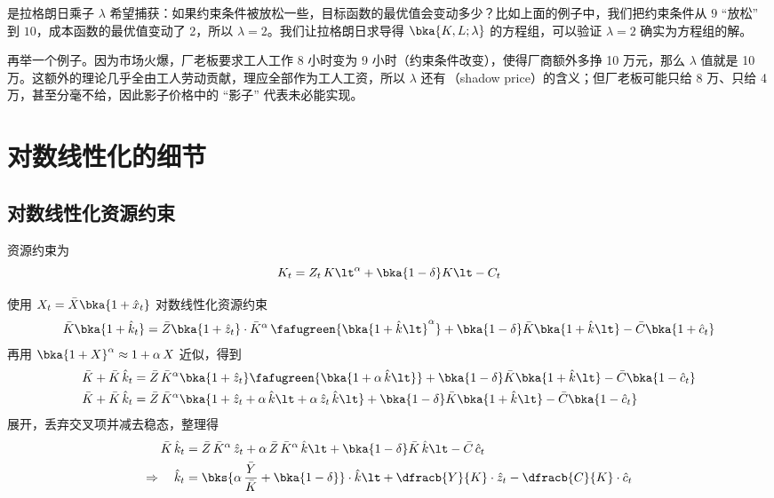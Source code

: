 是拉格朗日乘子 \(\lambda\) 希望捕获：如果约束条件被放松一些，目标函数的最优值会变动多少？比如上面的例子中，我们把约束条件从 \(9\) “放松” 到 \(10\)，成本函数的最优值变动了 2，所以 \(\lambda=2\)。我们让拉格朗日求导得 \(\bka{K,L;\lambda}\) 的方程组，可以验证 \(\lambda=2\) 确实为方程组的解。

再举一个例子。因为市场火爆，厂老板要求工人工作 8 小时变为 9 小时（约束条件改变），使得厂商额外多挣 10 万元，那么 \(\lambda\) 值就是 10 万。这额外的理论几乎全由工人劳动贡献，理应全部作为工人工资，所以 \(\lambda\) 还有\,（shadow price）的含义；但厂老板可能只给 8 万、只给 4 万，甚至分毫不给，因此影子价格中的 “影子” 代表未必能实现。

\section{对数线性化的细节}\label{sec:LogLinProcess}

\subsection{对数线性化资源约束}

资源约束为
\begin{equation*}
    K_t=Z_t\,K\lt^\alpha+\bka{1-\delta}K\lt-C_t
\end{equation*}


使用 \(X_t=\bar X\bka{1+\hat x_t}\) 对数线性化资源约束
\begin{align*}
    \bar K\bka{1+\hat k_t}=\bar Z\bka{1+\hat z_t}\cdot \bar K^{\alpha}\,\fafugreen{\bka{1+\hat k\lt}^\alpha}+\bka{1-\delta}\bar K\bka{1+\hat k\lt}-\bar C\bka{1+\hat c_t}
\end{align*}
再用 \(\bka{1+X}^\alpha\approx1+\alpha\,X\) 近似，得到
\begin{align*}
    \bar K+\bar K\,\hat k_t&=\bar Z\,\bar K^{\alpha}\bka{1+\hat z_t}\fafugreen{\bka{1+\alpha\,\hat k\lt}}+\bka{1-\delta}\bar K\bka{1+\hat k\lt}-\bar C\bka{1-\hat c_t}\\
    \bar K+\bar K\,\hat k_t&=\bar Z\,\bar K^\alpha\bka{1+\hat z_t+\alpha\,\hat k\lt+\alpha\,\hat z_t\,\hat k\lt}+\bka{1-\delta}\bar K\bka{1+\hat k\lt}-\bar C\bka{1-\hat c_t}
\end{align*}
展开，丢弃交叉项并减去稳态，整理得
\begin{align*}
    \bar K\,\hat k_t&=\bar Z\,\bar K^\alpha\,\hat z_t+\alpha\,\bar Z\,\bar K^\alpha\,\hat k\lt+\bka{1-\delta}\bar K\,\hat k\lt-\bar C\,\hat c_t\\
    \Rightarrow\quad \hat k_t&=\bks{\alpha\,\dfrac{\bar Y}{\bar K}+\bka{1-\delta}}\cdot\hat k\lt+\dfracb{Y}{K}\cdot\hat z_t-\dfracb{C}{K}\cdot\hat c_t
\end{align*}

